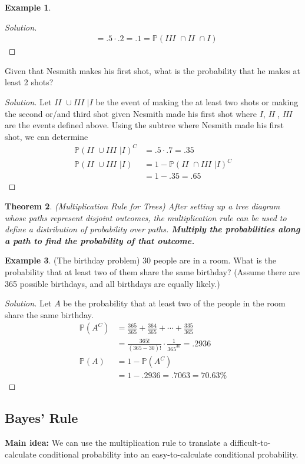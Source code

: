 \documentclass[12pt]{article}
\newcommand{\bbP}{\mathbb{P}}
\newcommand{\rom}[1]{\textit{#1 }}
\renewcommand{\_}[1]{\underline{ #1 }}
\newtheorem{theorem}{Theorem}[section]
\theoremstyle{definition}
\newtheorem{example}[theorem]{Example}
\numberwithin{equation}{subsection}
\begin{document}
\begin{example}
\begin{proof}[Solution]
\begin{align*}
				&=.5 \cdot .2 = .1 = \bbP(\rom{III} \cap \rom{II} \cap I)
		\end{align*}
		\end{proof}
	Given that Nesmith makes his first shot, what is the probability that he makes at least 2 shots?
		\begin{proof}[Solution]
		Let $\rom{II}\cup \rom{III}|I$ be the event of making the at least two shots or making the second or/and third shot given Nesmith made his first shot where $I$, \rom{II}, \rom{III} are the events defined above. Using the subtree where Nesmith made his first shot, we can determine
		\begin{align*}
			\bbP(\rom{II}\cup \rom{III}|I)^C&=.5\cdot .7=.35 \\
			\bbP(\rom{II}\cup \rom{III}|I)&=1-\bbP(\rom{II}\cap \rom{III}|I)^C \\
				&=1-.35=.65
		\end{align*}
		\end{proof}
\end{example}

\begin{theorem}
(Multiplication Rule for Trees)
 After setting up a tree diagram whose paths represent disjoint outcomes, the multiplication rule can be used to define a distribution of probability over paths. \textbf{Multiply the probabilities along a path to find the probability of that outcome.} 
 \end{theorem}

\begin{example}
	(The birthday problem) 30 people are in a room. What is the probability that at least two of them share the same birthday? (Assume there are 365 possible birthdays, and all birthdays are equally likely.)
		\begin{proof}[Solution]
			Let $A$ be the probability that at least two of the people in the room share the same birthday.
			\begin{align*}
				\bbP(A^C)&=\frac{365}{365}+\frac{364}{365}+\cdots+\frac{335}{365} \\
					&=\frac{365!}{(365-30)!}\cdot \frac{1}{365^{30}}=.2936 \\
				\bbP(A)&=1-\bbP(A^C) \\
					&=1-.2936=.7063=70.63\%
			\end{align*}
		\end{proof}
\end{example}

\subsection{Bayes' Rule}
\textbf{Main idea:} We can use the multiplication rule to translate a difficult-to-calculate conditional probability into an easy-to-calculate conditional probability.
\end{document}
